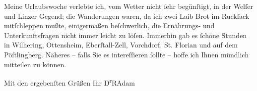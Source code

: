 \pstart
           Meine Urlaubswoche verlebte ich, vom Wetter nicht ſehr begünſtigt, in der Welſer und Linzer Gegend; die Wanderungen waren, da ich zwei Laib Brot im Ruckſack
               mitſchleppen mußte, einigermaßen beſchwerlich, die Ernährungs- und Unterkunftsfragen
               nicht immer leicht zu löſen. Immerhin gab es ſchöne Stunden in Wilhering, Ottensheim, Eberſtall-Zell, Vorchdorf, St. Florian und auf dem Pöſtlingberg. Näheres – falls Sie es
               intereſſieren ſollte – hoffe ich Ihnen münd{\pb}lich mitteilen zu können.\pend
           
\pstart
           Mit den ergebenſten Grüßen Ihr\pend
           \pstart \spacefill\mbox{D\textsuperscript{r}RAdam}\pend{}\endnumbering{}  
      